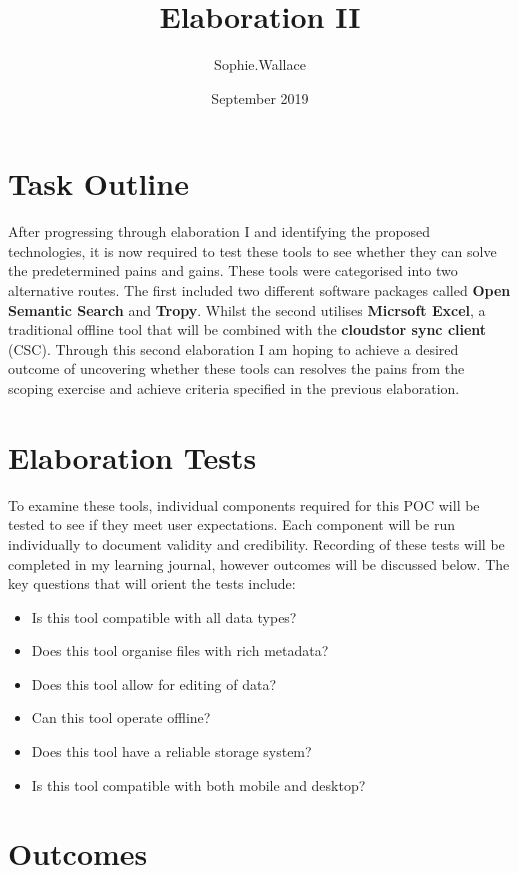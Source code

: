 \documentclass{article}
\title{Elaboration II}
\author{Sophie.Wallace }
\date{September 2019}
\begin{document}
\maketitle
\tableofcontents
\clearpage
\section{Task Outline}
After progressing through elaboration I and identifying the proposed technologies, it is now required to test these tools to see whether they can solve the predetermined pains and gains. These tools were categorised into two alternative routes. The first included two different software packages called \textbf{Open Semantic Search} and \textbf{Tropy}. Whilst the second utilises \textbf{Micrsoft Excel}, a traditional offline tool that will be combined with the \textbf{cloudstor sync client} (CSC). Through this second elaboration I am hoping to achieve a desired outcome of uncovering whether these tools can resolves the pains from the scoping exercise and achieve criteria specified in the previous elaboration.


\section{Elaboration Tests}
To examine these tools, individual components required for this POC will be tested to see if they meet user expectations. Each component will be run individually to document validity and credibility. Recording of these tests will be completed in my learning journal, however outcomes will be discussed below. The key questions that will orient the tests include:
\begin{itemize}
\item Is this tool compatible with all data types?
\item Does this tool organise files with rich metadata?
\item Does this tool allow for editing of data?
\item Can this tool operate offline?
\item Does this tool have a reliable storage system?
\item Is this tool compatible with both mobile and desktop?
\end{itemize}

\section{Outcomes}
\end{document}
